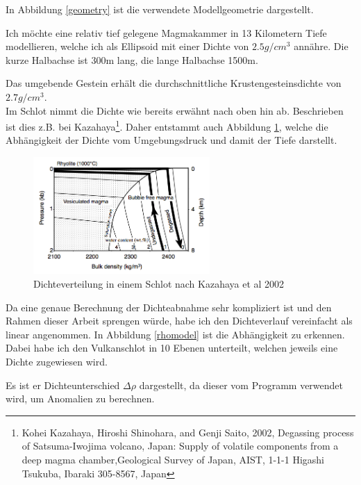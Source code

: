 \documentclass[12pt,a4paper]{scrartcl}
\begin{document}
In Abbildung \ref{geometry} ist die verwendete Modellgeometrie dargestellt.

Ich möchte eine relativ tief gelegene Magmakammer in 13 Kilometern Tiefe modellieren, welche ich als Ellipsoid mit einer Dichte von $2.5g/cm^3$ annähre. Die kurze Halbachse ist 300m lang, die lange Halbachse 1500m.

Das umgebende Gestein erhält die durchschnittliche Krustengesteinsdichte von $2.7g/cm^3$.\\

Im Schlot nimmt die Dichte wie bereits erwähnt nach oben hin ab. Beschrieben ist dies z.B. bei Kazahaya\footnote{
Kohei Kazahaya, Hiroshi Shinohara, and Genji Saito, 2002, Degassing process of Satsuma-Iwojima volcano, Japan: Supply of volatile components from a deep magma chamber,Geological Survey of Japan, AIST, 1-1-1 Higashi Tsukuba, Ibaraki 305-8567, Japan
}. Daher entstammt auch Abbildung \ref{origdens}, welche die Abhängigkeit der Dichte vom Umgebungsdruck und damit der Tiefe darstellt.\\

\begin{figure}[htb]
\centering
\includegraphics[width=0.6\textwidth]{../figures/origdens.png}
\caption{Dichteverteilung in einem Schlot nach Kazahaya et al 2002}
\label{origdens}
\end{figure}

\clearpage
Da eine genaue Berechnung der Dichteabnahme sehr kompliziert ist und den Rahmen dieser Arbeit sprengen würde, habe ich den Dichteverlauf vereinfacht als linear angenommen.
In Abbildung \ref{rhomodel} ist die Abhängigkeit zu erkennen. Dabei habe ich den Vulkanschlot in 10 Ebenen unterteilt, welchen jeweils eine Dichte zugewiesen wird.

Es ist er Dichteunterschied $\Delta \rho$ dargestellt, da dieser vom Programm verwendet wird, um Anomalien zu berechnen.
\end{document}
